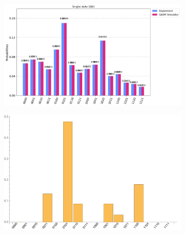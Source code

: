 \documentclass[10pt]{amsart}
\theoremstyle{definition}
\begin{document}
\begin{figure}[hbt]
    \begin{subfigure}{0.4\textwidth}
    \centering
    \includegraphics[width=0.9\linewidth]{inputSing2_quantum.png}
  \end{subfigure}
  \begin{subfigure}{0.4\textwidth}
    \centering
    \includegraphics[width=0.9\linewidth]{inputSing2_exact.pdf}
  \end{subfigure}
  

\end{figure}
\end{document}
